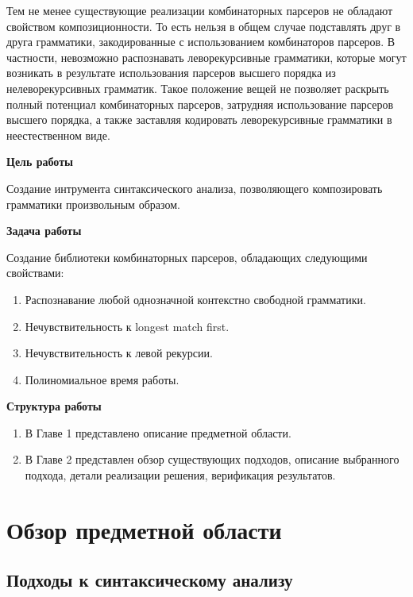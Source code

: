 \documentclass[times]{itmo-student-thesis}
\begin{document}
Тем не менее существующие реализации комбинаторных парсеров  не обладают свойством композиционности. То есть нельзя в
общем случае подставлять друг в друга грамматики, закодированные с использованием комбинаторов парсеров. В частности,
невозможно распознавать леворекурсивные грамматики, которые могут возникать в результате использования парсеров высшего
порядка из нелеворекурсивных грамматик.  Такое положение вещей не позволяет раскрыть полный потенциал комбинаторных
парсеров, затрудняя использование парсеров высшего порядка, а также заставляя кодировать леворекурсивные грамматики в
неестественном виде.

\textbf{Цель работы}

Создание интрумента синтаксического анализа, позволяющего композировать грамматики произвольным образом. 

\textbf{Задача работы}

Создание библиотеки комбинаторных парсеров, обладающих следующими свойствами:

\begin{enumerate}
    \item Распознавание любой однозначной контекстно свободной грамматики.
    \item Нечувствительность к longest match first.
    \item Нечувствительность к левой рекурсии.
    \item Полиномиальное время работы.
\end{enumerate}

\textbf{Структура работы}

\begin{enumerate}
    \item В Главе 1 представлено описание предметной области.
    \item В Главе 2 представлен обзор существующих подходов, описание выбранного подхода, детали реализации решения,
    верификация результатов.
\end{enumerate}

\chapter{Обзор предметной области}

\section{Подходы к синтаксическому анализу}\label{sec:parsing_approaches}
\end{document}
